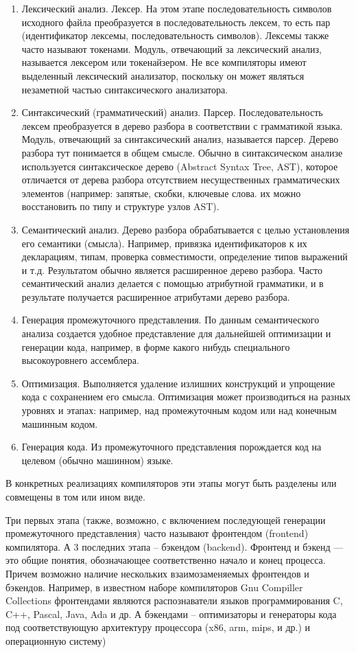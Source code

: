 \documentclass[a4paper,12pt,titlepage]{extarticle}
\begin{document}
\begin{enumerate}
  \item Лексический анализ. Лексер. На этом этапе последовательность символов
  исходного файла преобразуется в последовательность лексем, то есть пар (идентификатор
  лексемы, последовательность символов). Лексемы также часто называют токенами.
  Модуль, отвечающий за лексический анализ, называется лексером или
  токенайзером. Не все компиляторы имеют выделенный лексический анализатор,
  поскольку он может являться незаметной частью синтаксического анализатора.
  \item Синтаксический (грамматический) анализ. Парсер. Последовательность
  лексем преобразуется в дерево разбора в соответствии с грамматикой языка.
  Модуль, отвечающий за синтаксический анализ, называется парсер. Дерево
  разбора тут понимается в общем смысле. Обычно в синтаксическом анализе
  используется синтаксическое дерево (Abstract Syntax Tree, AST), которое
  отличается от дерева разбора отсутствием несущественных грамматических элементов
  (например: запятые, скобки, ключевые слова. их можно восстановить по
  типу и структуре узлов AST).
  \item Семантический анализ. Дерево разбора обрабатывается с целью
  установления его семантики (смысла). Например, привязка идентификаторов к
  их декларациям, типам, проверка совместимости, определение типов выражений и
  т.д. Результатом обычно является расширенное дерево разбора. Часто
  семантический анализ делается с помощью атрибутной грамматики, и в результате
  получается расширенное атрибутами дерево разбора.
  \item Генерация промежуточного представления. По данным семантического
  анализа создается удобное представление для дальнейшей оптимизации и
  генерации кода, например, в форме какого нибудь специального высокоуровнего
  ассемблера.
  \item Оптимизация. Выполняется удаление излишних конструкций и упрощение кода
  с сохранением его смысла. Оптимизация может производиться на разных уровнях и
  этапах: например, над промежуточным кодом или над конечным машинным кодом.
  \item Генерация кода. Из промежуточного представления порождается код на
  целевом (обычно машинном) языке.
\end{enumerate}
В конкретных реализациях компиляторов эти этапы могут быть разделены или
совмещены в том или ином виде.

Три первых этапа (также, возможно, с включением последующей генерации
промежуточного представления) часто называют фронтендом (frontend) компилятора.
А 3 последних этапа -- бэкендом (backend). Фронтенд и бэкенд --- это общие
понятия, обозначающее соответственно начало и конец процесса. Причем возможно
наличие нескольких взаимозаменяемых фронтендов и бэкендов. Например, в
известном наборе компиляторов Gnu Compiller Collections фронтендами являются
распознаватели языков программирования C, C++, Pascal, Java, Ada и др. А
бэкендами -- оптимизаторы и генераторы кода под соответствующую архитектуру процессора
(x86, arm, mips, и др.) и операционную систему)
\end{document}
